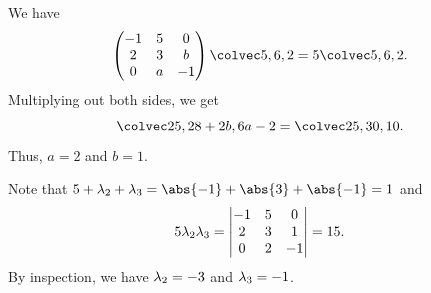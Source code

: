 \begin{solution}
    \begin{ppart}
        We have \[\begin{pmatrix}-1 & 5 & 0 \\ 2 & 3 & b \\ 0 & a & -1\end{pmatrix} \cveciii562 = 5\cveciii562.\] Multiplying out both sides, we get \[\cveciii{25}{28+2b}{6a-2} = \cveciii{25}{30}{10}.\] Thus, $a = 2$ and $b = 1$.
    \end{ppart}
    \begin{ppart}
        Note that $5 + \l_2 + \l_3 = \abs{-1} + \abs{3} + \abs{-1} = 1$ and \[5\lambda_2\lambda_3 = \begin{vmatrix}-1 & 5 & 0 \\ 2 & 3 & 1 \\ 0 & 2 & -1\end{vmatrix} = 15.\] By inspection, we have $\lambda_2 = -3$ and $\lambda_3 = -1$.


\end{ppart}
\end{solution}

